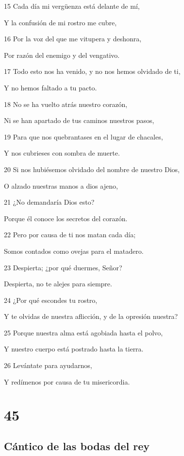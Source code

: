 \par 15 Cada día mi vergüenza está delante de mí,
\par Y la confusión de mi rostro me cubre,
\par 16 Por la voz del que me vitupera y deshonra,
\par Por razón del enemigo y del vengativo.
\par 17 Todo esto nos ha venido, y no nos hemos olvidado de ti,
\par Y no hemos faltado a tu pacto.
\par 18 No se ha vuelto atrás nuestro corazón,
\par Ni se han apartado de tus caminos nuestros pasos,
\par 19 Para que nos quebrantases en el lugar de chacales,
\par Y nos cubrieses con sombra de muerte.
\par 20 Si nos hubiésemos olvidado del nombre de nuestro Dios,
\par O alzado nuestras manos a dios ajeno,
\par 21 ¿No demandaría Dios esto?
\par Porque él conoce los secretos del corazón.
\par 22 Pero por causa de ti nos matan cada día;
\par Somos contados como ovejas para el matadero.
\par 23 Despierta; ¿por qué duermes, Señor?
\par Despierta, no te alejes para siempre.
\par 24 ¿Por qué escondes tu rostro,
\par Y te olvidas de nuestra aflicción, y de la opresión nuestra?
\par 25 Porque nuestra alma está agobiada hasta el polvo,
\par Y nuestro cuerpo está postrado hasta la tierra.
\par 26 Levántate para ayudarnos,
\par Y redímenos por causa de tu misericordia.

\chapter{45}

\section*{Cántico de las bodas del rey}

